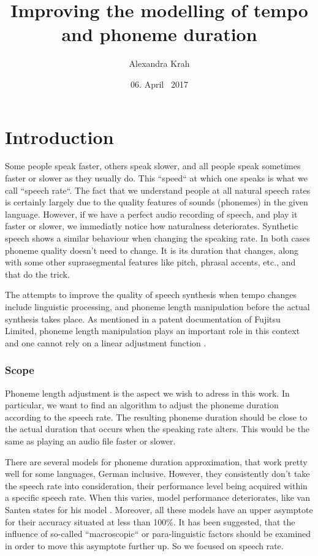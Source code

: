 \documentclass[a4paper]{scrreprt}
\begin{document}
\title{Improving the modelling of tempo and phoneme duration}
\author{Alexandra Krah}
\date{06. April ~2017}
\maketitle
\chapter*{}
\tableofcontents
\listoffigures

\chapter{Introduction}
Some people speak faster, others speak slower, and all people speak sometimes faster or slower as they usually do. This ``speed`` at which one speaks is what we call ``speech rate``. The fact that we understand people at all natural speech rates is certainly largely due to the quality features of sounds (phonemes) in the given language. However, if we have a perfect audio recording of speech, and play it faster or slower, we immediatly notice how naturalness deteriorates. Synthetic speech shows a similar behaviour when changing the speaking rate. In both cases phoneme quality doesn't need to change. It is its duration that changes, along with some other suprasegmental features like pitch, phrasal accents, etc., and that do the trick. 

The attempts to improve the quality of speech synthesis when tempo changes include linguistic processing, and phoneme length manipulation before the actual synthesis takes place. As mentioned in a patent documentation of Fujitsu Limited, phoneme length manipulation plays an important role in this context and one cannot rely on a linear adjustment function \cite{nishiike2008}. 

\subsection*{Scope}
Phoneme length adjustment is the aspect we wish to adress in this work. In particular, we want to find an algorithm to adjust the phoneme duration according to the speech rate. The resulting phoneme duration should be close to the actual duration that occurs when the speaking rate alters. This would be the same as playing an audio file faster or slower. 

There are several models for phoneme duration approximation, that work pretty well for some languages, German inclusive. However, they consistently don't take the speech rate into consideration, their performance level being acquired within a specific speech rate. When this varies, model performance deteriorates, like van Santen states for his model \cite{Santen1994}. Moreover, all these models have an upper asymptote for their accuracy situated at less than 100\%. It has been suggested, that the influence of so-called ``macroscopic`` \cite{Cummins1999} or para-linguistic \cite{Santen1994} factors should be examined in order to move this asymptote further up. So we focused on speech rate. 
\end{document}
